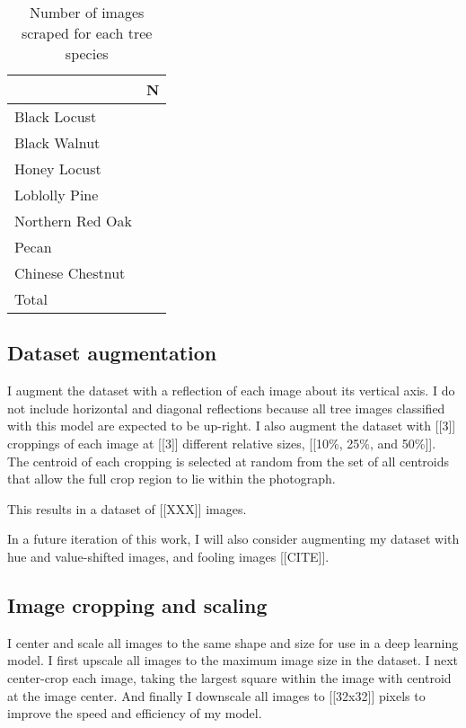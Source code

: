 \documentclass[10pt,twocolumn,letterpaper]{article}
\begin{document}
\begin{table}
\begin{center}
\begin{tabular}{|l|c|}
\hline
& N \\
\hline\hline
Black Locust & \\
Black Walnut & \\
Honey Locust & \\
Loblolly Pine & \\
Northern Red Oak & \\
Pecan & \\
Chinese Chestnut & \\
\hline\hline
Total & \\
\hline
\end{tabular}
\end{center}
\caption{Number of images scraped for each tree species}
\end{table}

\subsection{Dataset augmentation}

I augment the dataset with a reflection of each image about its vertical axis. I do not include horizontal and diagonal reflections because all tree images classified with this model are expected to be up-right. I also augment the dataset with [[3]] croppings of each image at [[3]] different relative sizes, [[10\%, 25\%, and 50\%]]. The centroid of each cropping is selected at random from the set of all centroids that allow the full crop region to lie within the photograph.

This results in a dataset of [[XXX]] images.

In a future iteration of this work, I will also consider augmenting my dataset with hue and value-shifted images, and fooling images [[CITE]].

\subsection{Image cropping and scaling}

I center and scale all images to the same shape and size for use in a deep learning model. I first upscale all images to the maximum image size in the dataset. I next center-crop each image, taking the largest square within the image with centroid at the image center. And finally I downscale all images to [[32x32]] pixels to improve the speed and efficiency of my model.
\end{document}
